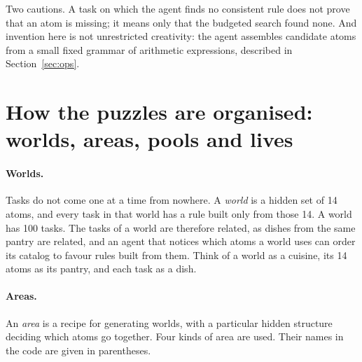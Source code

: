 \documentclass[11pt]{article}
\begin{document}
Two cautions. A task on which the agent finds no consistent rule does not prove that an atom is missing; it means only that the budgeted search found none. And invention here is not unrestricted creativity: the agent assembles candidate atoms from a small fixed grammar of arithmetic expressions, described in Section~\ref{sec:ops}.

\section{How the puzzles are organised: worlds, areas, pools and lives}
\label{sec:areas}

\paragraph{Worlds.} Tasks do not come one at a time from nowhere. A \emph{world} is a hidden set of 14 atoms, and every task in that world has a rule built only from those 14. A world has 100 tasks. The tasks of a world are therefore related, as dishes from the same pantry are related, and an agent that notices which atoms a world uses can order its catalog to favour rules built from them. Think of a world as a cuisine, its 14 atoms as its pantry, and each task as a dish.

\paragraph{Areas.} An \emph{area} is a recipe for generating worlds, with a particular hidden structure deciding which atoms go together. Four kinds of area are used. Their names in the code are given in parentheses.
\end{document}
